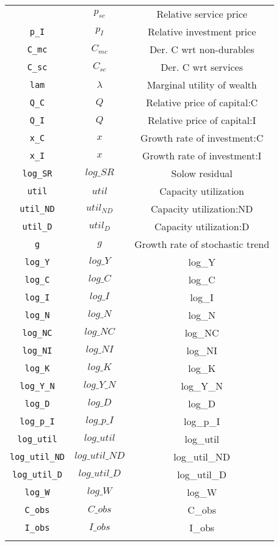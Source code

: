 \begin{center}
\begin{longtable}{ccc}
{\texttt{p\_sc} & ${p_{sc}}$ & Relative service price\\
\texttt{p\_I} & ${p_I}$ & Relative investment price\\
\texttt{C\_mc} & ${C_{mc}}$ & Der. C wrt non-durables\\
\texttt{C\_sc} & ${C_{sc}}$ & Der. C wrt services\\
\texttt{lam} & ${\lambda}$ & Marginal utility of wealth\\
\texttt{Q\_C} & ${Q}$ & Relative price of capital:C\\
\texttt{Q\_I} & ${Q}$ & Relative price of capital:I\\
\texttt{x\_C} & ${x}$ & Growth rate of investment:C\\
\texttt{x\_I} & ${x}$ & Growth rate of investment:I\\
\texttt{log\_SR} & $log\_SR$ & Solow residual\\
\texttt{util} & ${util}$ & Capacity utilization\\
\texttt{util\_ND} & ${util_{ND}}$ & Capacity utilization:ND\\
\texttt{util\_D} & ${util_D}$ & Capacity utilization:D\\
\texttt{g} & ${g}$ & Growth rate of stochastic trend\\
\texttt{log\_Y} & $log\_Y$ & log\_Y\\
\texttt{log\_C} & $log\_C$ & log\_C\\
\texttt{log\_I} & $log\_I$ & log\_I\\
\texttt{log\_N} & $log\_N$ & log\_N\\
\texttt{log\_NC} & $log\_NC$ & log\_NC\\
\texttt{log\_NI} & $log\_NI$ & log\_NI\\
\texttt{log\_K} & $log\_K$ & log\_K\\
\texttt{log\_Y\_N} & $log\_Y\_N$ & log\_Y\_N\\
\texttt{log\_D} & $log\_D$ & log\_D\\
\texttt{log\_p\_I} & $log\_p\_I$ & log\_p\_I\\
\texttt{log\_util} & $log\_util$ & log\_util\\
\texttt{log\_util\_ND} & $log\_util\_ND$ & log\_util\_ND\\
\texttt{log\_util\_D} & $log\_util\_D$ & log\_util\_D\\
\texttt{log\_W} & $log\_W$ & log\_W\\
\texttt{C\_obs} & $C\_obs$ & C\_obs\\
\texttt{I\_obs} & $I\_obs$ & I\_obs\\
}
\end{longtable}
\end{center}
